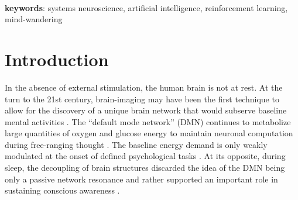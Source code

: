 \documentclass[10pt,letterpaper]{article}
\begin{document}
\textbf{\\keywords}: systems neuroscience, artificial intelligence, reinforcement learning, mind-wandering



\section{Introduction}
%
In the absence of external stimulation, the human brain is not at rest.
At the turn to the 21st century,
brain-imaging may have been the first technique
to allow for the discovery of a unique brain network that would subserve
baseline mental activities
\citep{raichle2001pnas, randy2008, bzdok2015resting}.
The ``default mode network'' (DMN) continues
to metabolize large quantities of
oxygen and glucose energy to maintain
neuronal computation
during free-ranging thought
\citep{kenet2003spontaneously, fiser2004small}.
The baseline energy demand is only weakly modulated
at the onset of defined psychological tasks \citep{raichle_baseline}.
At its opposite, during sleep, the
decoupling of brain structures discarded the idea of the DMN being
only a passive network resonance and rather supported an
important role in sustaining conscious awareness \citep{horovitz2009decoupling}.
\end{document}
